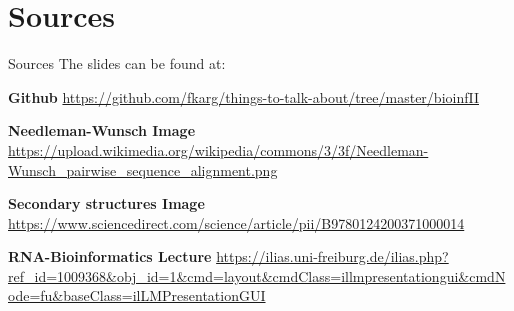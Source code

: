 
\section{Sources}

\begin{frame}{Sources}
    The slides can be found at: \newline \newline

    \beamertemplatearticlebibitems
    \begin{thebibliography}{10}

        {\bf Github}
        \newblock \url{https://github.com/fkarg/things-to-talk-about/tree/master/bioinfII}
    \newline

            {\bf Needleman-Wunsch Image}
            \newblock \url{https://upload.wikimedia.org/wikipedia/commons/3/3f/Needleman-Wunsch_pairwise_sequence_alignment.png}

            {\bf Secondary structures Image}
            \newblock \url{https://www.sciencedirect.com/science/article/pii/B9780124200371000014}

            {\bf RNA-Bioinformatics Lecture}
            \newblock \url{https://ilias.uni-freiburg.de/ilias.php?ref_id=1009368&obj\_id=1&cmd=layout&cmdClass=illmpresentationgui&cmdNode=fu&baseClass=ilLMPresentationGUI}


\end{thebibliography}
\end{frame}
